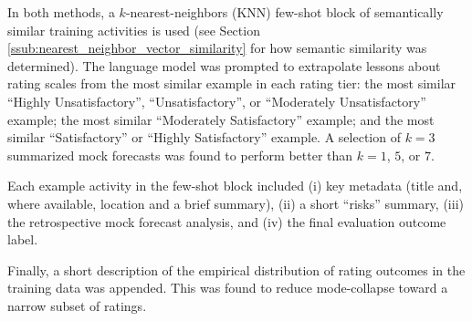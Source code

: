 \documentclass[12pt,a4paper]{article}
\begin{document}
In both methods, a $k$-nearest-neighbors (KNN) few-shot block of semantically similar training activities is used (see Section \ref{ssub:nearest_neighbor_vector_similarity} for how semantic similarity was determined). The language model was prompted to extrapolate lessons about rating scales from the most similar example in each rating tier: the most similar ``Highly Unsatisfactory'', ``Unsatisfactory'', or ``Moderately Unsatisfactory'' example; the most similar ``Moderately Satisfactory'' example; and the most similar ``Satisfactory'' or ``Highly Satisfactory'' example. A selection of $k=3$ summarized mock forecasts was found to perform better than $k=1$, $5$, or $7$.

Each example activity in the few-shot block included (i) key metadata (title and, where available, location and a brief summary), (ii) a short ``risks'' summary, (iii) the retrospective mock forecast analysis, and (iv) the final evaluation outcome label.

Finally, a short description of the empirical distribution of rating outcomes in the training data was appended. This was found to reduce mode-collapse toward a narrow subset of ratings.
\end{document}
